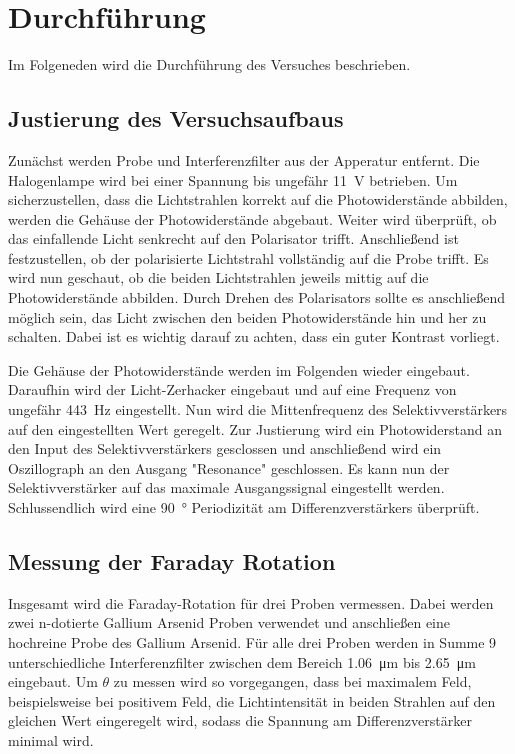 \section{Durchführung}
\label{sec:durchführung}

Im Folgeneden wird die Durchführung des Versuches beschrieben.

\subsection{Justierung des Versuchsaufbaus}
\label{sec:Justierung}

Zunächst werden Probe und Interferenzfilter aus der Apperatur entfernt. Die Halogenlampe wird bei einer
Spannung bis ungefähr \qty{11}{\volt} betrieben. Um sicherzustellen, dass die Lichtstrahlen korrekt auf die 
Photowiderstände abbilden, werden die Gehäuse der Photowiderstände abgebaut.
Weiter wird überprüft, ob das einfallende Licht senkrecht auf den Polarisator trifft.
Anschließend ist festzustellen, ob der polarisierte Lichtstrahl vollständig auf die Probe trifft.
Es wird nun geschaut, ob die beiden Lichtstrahlen jeweils mittig auf die Photowiderstände abbilden.
Durch Drehen des Polarisators sollte es anschließend möglich sein, das Licht zwischen den beiden Photowiderstände
hin und her zu schalten. Dabei ist es wichtig darauf zu achten, dass ein guter Kontrast vorliegt.

Die Gehäuse der Photowiderstände werden im Folgenden wieder eingebaut.
Daraufhin wird der Licht-Zerhacker eingebaut und auf eine Frequenz von ungefähr
\qty{443}{\hertz} eingestellt. Nun wird die Mittenfrequenz des Selektivverstärkers auf den eingestellten Wert geregelt.
Zur Justierung wird ein Photowiderstand an den Input des Selektivverstärkers gesclossen und anschließend
wird ein Oszillograph an den Ausgang "Resonance" geschlossen. Es kann nun der Selektivverstärker auf
das maximale Ausgangssignal eingestellt werden.
Schlussendlich wird eine \qty{90}{\degree} Periodizität am Differenzverstärkers überprüft.

\subsection{Messung der Faraday Rotation}
\label{sec:Faraday Rotation}

Insgesamt wird die Faraday-Rotation für drei Proben vermessen. Dabei werden zwei n-dotierte Gallium Arsenid Proben 
verwendet und anschließen eine hochreine Probe des Gallium Arsenid.
Für alle drei Proben werden in Summe 9 unterschiedliche Interferenzfilter zwischen dem Bereich \qty{1.06}{\micro\meter} 
bis \qty{2.65}{\micro\meter} eingebaut. Um $\theta$ zu messen wird so vorgegangen, dass bei maximalem Feld, beispielsweise bei
positivem Feld, die Lichtintensität in beiden Strahlen auf den gleichen Wert eingeregelt wird, sodass die Spannung am 
Differenzverstärker minimal wird.

